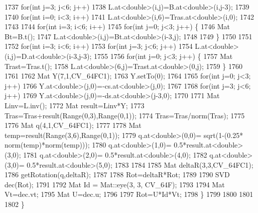 \begin{DoxyCode}
1737             \textcolor{keywordflow}{for}(\textcolor{keywordtype}{int} j=3; j<6; j++)
1738                 L.at<\textcolor{keywordtype}{double}>(i,j)=B.at<\textcolor{keywordtype}{double}>(i,j-3);
1739 
1740         \textcolor{keywordflow}{for}(\textcolor{keywordtype}{int} i=0; i<3; i++)
1741             L.at<\textcolor{keywordtype}{double}>(i,6)=Tras.at<\textcolor{keywordtype}{double}>(i,0);
1742 
1743 
1744         \textcolor{keywordflow}{for}(\textcolor{keywordtype}{int} i=3; i<6; i++)
1745             \textcolor{keywordflow}{for}(\textcolor{keywordtype}{int} j=0; j<3; j++) \{
1746                 Mat Bt=B.t();
1747                 L.at<\textcolor{keywordtype}{double}>(i,j)=Bt.at<\textcolor{keywordtype}{double}>(i-3,j);
1748 
1749             \}
1750 
1751 
1752         \textcolor{keywordflow}{for}(\textcolor{keywordtype}{int} i=3; i<6; i++)
1753             \textcolor{keywordflow}{for}(\textcolor{keywordtype}{int} j=3; j<6; j++)
1754                 L.at<\textcolor{keywordtype}{double}>(i,j)=D.at<\textcolor{keywordtype}{double}>(i-3,j-3);
1755 
1756         \textcolor{keywordflow}{for}(\textcolor{keywordtype}{int} j=0; j<3; j++) \{
1757             Mat Trast=Tras.t();
1758             L.at<\textcolor{keywordtype}{double}>(6,j)=Trast.at<\textcolor{keywordtype}{double}>(0,j);
1759         \}
1760 
1761 
1762         Mat Y(7,1,CV\_64FC1);
1763         Y.setTo(0);
1764 
1765         \textcolor{keywordflow}{for}(\textcolor{keywordtype}{int} j=0; j<3; j++)
1766             Y.at<\textcolor{keywordtype}{double}>(j,0)=-cs.at<\textcolor{keywordtype}{double}>(j,0);
1767 
1768         \textcolor{keywordflow}{for}(\textcolor{keywordtype}{int} j=3; j<6; j++)
1769             Y.at<\textcolor{keywordtype}{double}>(j,0)=-ds.at<\textcolor{keywordtype}{double}>(j-3,0);
1770 
1771         Mat Linv=L.inv();
1772         Mat result=Linv*Y;
1773         Tras=Tras+result(Range(0,3),Range(0,1));
1774         Tras=Tras/norm(Tras);
1775 
1776         Mat q(4,1,CV\_64FC1);
1777 
1778         Mat temp=result(Range(3,6),Range(0,1));
1779         q.at<\textcolor{keywordtype}{double}>(0,0)= sqrt(1-(0.25* norm(temp)*norm(temp)));
1780         q.at<\textcolor{keywordtype}{double}>(1,0)= 0.5*result.at<\textcolor{keywordtype}{double}>(3,0);
1781         q.at<\textcolor{keywordtype}{double}>(2,0)= 0.5*result.at<\textcolor{keywordtype}{double}>(4,0);
1782         q.at<\textcolor{keywordtype}{double}>(3,0)= 0.5*result.at<\textcolor{keywordtype}{double}>(5,0);
1783 
1784 
1785         Mat deltaR(3,3,CV\_64FC1);
1786         getRotation(q,deltaR);
1787 
1788         Rot=deltaR*Rot;
1789 
1790         SVD dec(Rot);
1791 
1792         Mat Id = Mat::eye(3, 3, CV\_64F);
1793 
1794         Mat Vt=dec.vt;
1795         Mat U=dec.u;
1796 
1797         Rot=U*Id*Vt;
1798     \}
1799 
1800 
1801 
1802 \}
\end{DoxyCode}
\mbox{\label{classStereoCamera_a36dae897d07544e8faca8c90216173a6}} 
